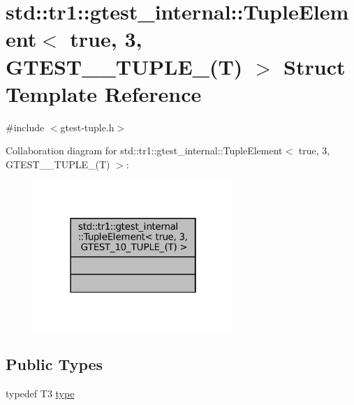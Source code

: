 \hypertarget{structstd_1_1tr1_1_1gtest__internal_1_1TupleElement_3_01true_00_013_00_01GTEST__10__TUPLE___07T_08_01_4}{}\section{std\+:\+:tr1\+:\+:gtest\+\_\+internal\+:\+:Tuple\+Element$<$ true, 3, G\+T\+E\+S\+T\+\_\+\_\+\+T\+U\+P\+L\+E\+\_\+(T) $>$ Struct Template Reference}
\label{structstd_1_1tr1_1_1gtest__internal_1_1TupleElement_3_01true_00_013_00_01GTEST__10__TUPLE___07T_08_01_4}


{\ttfamily \#include $<$gtest-\/tuple.\+h$>$}



Collaboration diagram for std\+:\+:tr1\+:\+:gtest\+\_\+internal\+:\+:Tuple\+Element$<$ true, 3, G\+T\+E\+S\+T\+\_\+\_\+\+T\+U\+P\+L\+E\+\_\+(T) $>$\+:
\nopagebreak
\begin{figure}[H]
\begin{center}
\leavevmode
\includegraphics[width=214pt]{structstd_1_1tr1_1_1gtest__internal_1_1TupleElement_3_01true_00_013_00_01GTEST__10__TUPLE___07T_08_01_4__coll__graph}
\end{center}
\end{figure}
\subsection*{Public Types}
\begin{DoxyCompactItemize}
\item 
typedef T3 \hyperlink{structstd_1_1tr1_1_1gtest__internal_1_1TupleElement_3_01true_00_013_00_01GTEST__10__TUPLE___07T_08_01_4_a0abc8519ff756a7736076063626a2718}{type}
\end{DoxyCompactItemize}


